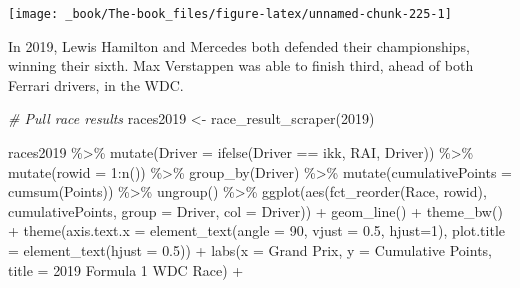 \documentclass[
]{book}
\newenvironment{Shaded}{\begin{snugshade}}{\end{snugshade}}
\newcommand{\AttributeTok}[1]{\textcolor[rgb]{0.77,0.63,0.00}{#1}}
\newcommand{\CommentTok}[1]{\textcolor[rgb]{0.56,0.35,0.01}{\textit{#1}}}
\newcommand{\DecValTok}[1]{\textcolor[rgb]{0.00,0.00,0.81}{#1}}
\newcommand{\FloatTok}[1]{\textcolor[rgb]{0.00,0.00,0.81}{#1}}
\newcommand{\FunctionTok}[1]{\textcolor[rgb]{0.00,0.00,0.00}{#1}}
\newcommand{\NormalTok}[1]{#1}
\newcommand{\OtherTok}[1]{\textcolor[rgb]{0.56,0.35,0.01}{#1}}
\newcommand{\SpecialCharTok}[1]{\textcolor[rgb]{0.00,0.00,0.00}{#1}}
\newcommand{\StringTok}[1]{\textcolor[rgb]{0.31,0.60,0.02}{#1}}
\begin{document}
\begin{center}\texttt{[image: \_book/The-book\_files/figure-latex/unnamed-chunk-225-1]} \end{center}

In 2019, Lewis Hamilton and Mercedes both defended their championships, winning their sixth. Max Verstappen was able to finish third, ahead of both Ferrari drivers, in the WDC.

\begin{Shaded}
\begin{Highlighting}[]
\CommentTok{\# Pull race results}
\NormalTok{races2019 }\OtherTok{\textless{}{-}} \FunctionTok{race\_result\_scraper}\NormalTok{(}\DecValTok{2019}\NormalTok{)}

\NormalTok{races2019 }\SpecialCharTok{\%\textgreater{}\%}
  \FunctionTok{mutate}\NormalTok{(}\AttributeTok{Driver =} \FunctionTok{ifelse}\NormalTok{(Driver }\SpecialCharTok{==} \StringTok{\textquotesingle{}ikk\textquotesingle{}}\NormalTok{, }\StringTok{\textquotesingle{}RAI\textquotesingle{}}\NormalTok{, Driver)) }\SpecialCharTok{\%\textgreater{}\%} 
  \FunctionTok{mutate}\NormalTok{(}\AttributeTok{rowid =} \DecValTok{1}\SpecialCharTok{:}\FunctionTok{n}\NormalTok{()) }\SpecialCharTok{\%\textgreater{}\%}
  \FunctionTok{group\_by}\NormalTok{(Driver) }\SpecialCharTok{\%\textgreater{}\%} 
  \FunctionTok{mutate}\NormalTok{(}\AttributeTok{cumulativePoints =} \FunctionTok{cumsum}\NormalTok{(Points)) }\SpecialCharTok{\%\textgreater{}\%}
  \FunctionTok{ungroup}\NormalTok{() }\SpecialCharTok{\%\textgreater{}\%} 
  \FunctionTok{ggplot}\NormalTok{(}\FunctionTok{aes}\NormalTok{(}\FunctionTok{fct\_reorder}\NormalTok{(Race, rowid), cumulativePoints,}
         \AttributeTok{group =}\NormalTok{ Driver, }\AttributeTok{col =}\NormalTok{ Driver)) }\SpecialCharTok{+}
  \FunctionTok{geom\_line}\NormalTok{() }\SpecialCharTok{+}
  \FunctionTok{theme\_bw}\NormalTok{() }\SpecialCharTok{+} 
  \FunctionTok{theme}\NormalTok{(}\AttributeTok{axis.text.x =} \FunctionTok{element\_text}\NormalTok{(}\AttributeTok{angle =} \DecValTok{90}\NormalTok{, }\AttributeTok{vjust =} \FloatTok{0.5}\NormalTok{, }\AttributeTok{hjust=}\DecValTok{1}\NormalTok{),}
        \AttributeTok{plot.title =} \FunctionTok{element\_text}\NormalTok{(}\AttributeTok{hjust =} \FloatTok{0.5}\NormalTok{)) }\SpecialCharTok{+}
  \FunctionTok{labs}\NormalTok{(}\AttributeTok{x =} \StringTok{\textquotesingle{}Grand Prix\textquotesingle{}}\NormalTok{,}
       \AttributeTok{y =} \StringTok{\textquotesingle{}Cumulative Points\textquotesingle{}}\NormalTok{,}
       \AttributeTok{title =} \StringTok{\textquotesingle{}2019 Formula 1 WDC Race\textquotesingle{}}\NormalTok{) }\SpecialCharTok{+}

\end{Highlighting}
\end{Shaded}
\end{document}
